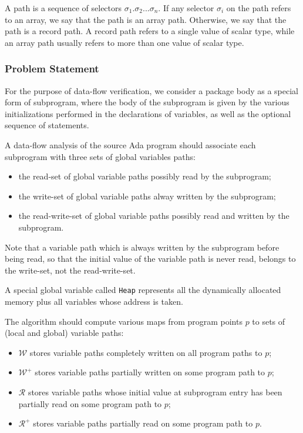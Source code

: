 \documentclass[fullpage]{article}
\newcommand{\code}[1]{\texttt{#1}}
\newcommand{\heap}{\code{Heap}\xspace}
\newcommand{\allwrites}{$\mathcal{W^+}$\xspace}
\newcommand{\writes}{$\mathcal{W}$\xspace}
\newcommand{\allreads}{$\mathcal{R^+}$\xspace}
\newcommand{\reads}{$\mathcal{R}$\xspace}
\newcommand{\sel}{\ensuremath{\sigma}\xspace}
\begin{document}
A path is a sequence of selectors $\sel_1.\sel_2...\sel_n$.  If any selector
$\sel_i$ on the path refers to an array, we say that the path is an array
path. Otherwise, we say that the path is a record path. A record path refers to
a single value of scalar type, while an array path usually refers to more than
one value of scalar type.
 
\subsubsection{Problem Statement}

For the purpose of data-flow verification, we consider a package body as a
special form of subprogram, where the body of the subprogram is given by the
various initializations performed in the declarations of variables, as well as
the optional sequence of statements.

A data-flow analysis of the source Ada program should associate each subprogram
with three sets of global variables paths:
\begin{itemize}
\item the read-set of global variable paths possibly read by the subprogram;
\item the write-set of global variable paths alway written by the subprogram;
\item the read-write-set of global variable paths possibly read and written by
  the subprogram.
\end{itemize}

Note that a variable path which is always written by the subprogram before
being read, so that the initial value of the variable path is never read,
belongs to the write-set, not the read-write-set.

A special global variable called \heap represents all the dynamically allocated
memory plus all variables whose address is taken.

The algorithm should compute various maps from program points $p$ to sets of
(local and global) variable paths:
\begin{itemize}
\item \writes stores variable paths completely written on all program paths
  to $p$;
\item \allwrites stores variable paths partially written on some program
  path to $p$;
\item \reads stores variable paths whose initial value at subprogram entry has
  been partially read on some program path to $p$;
\item \allreads stores variable paths partially read on some program path to
  $p$.
\end{itemize}
\end{document}
